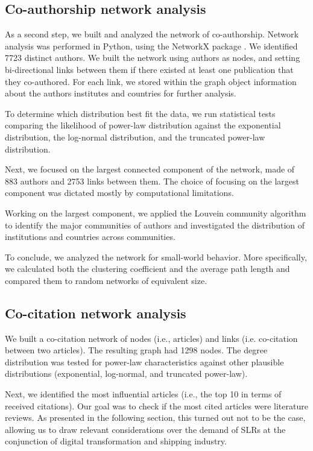 \documentclass[a4paper, review, endfloat, authoryear]{elsarticle}
\begin{document}
	\subsection{Co-authorship network analysis}
	As a second step, we built and analyzed the network of co-authorship. Network analysis was performed in Python, using the NetworkX package \citep{hagberg2008exploring}. We identified 7723 distinct authors. We built the network using authors as nodes, and setting bi-directional links between them if there existed at least one publication that they co-authored. For each link, we stored within the graph object information about the authors institutes and countries for further analysis.
	
	To determine which distribution best fit the data, we run statistical tests comparing the likelihood of power-law distribution against the exponential distribution, the log-normal distribution, and the truncated power-law distribution.
	
	Next, we focused on the largest connected component of the network, made of 883 authors and 2753 links between them. The choice of focusing on the largest component was dictated mostly by computational limitations.
	
	Working on the largest component, we applied the Louvein community \citep{blondel2008fast} algorithm to identify the major communities of authors and investigated the distribution of institutions and countries across communities.
	
	To conclude, we analyzed the network for small-world behavior. More specifically, we calculated both the clustering coefficient and the average path length and compared them to random networks of equivalent size.
	
	\subsection{Co-citation network analysis}
	We built a co-citation network of nodes (i.e., articles) and links (i.e. co-citation between two articles). The resulting graph had 1298 nodes. The degree distribution was tested for power-law characteristics against other plausible distributions (exponential, log-normal, and truncated power-law).
	
	Next, we identified the most influential articles (i.e., the top 10 in terms of received citations). Our goal was to check if the most cited articles were literature reviews. As presented in the following section, this turned out not to be the case, allowing us to draw relevant considerations over the demand of SLRs at the conjunction of digital transformation and shipping industry.
	
\end{document}
